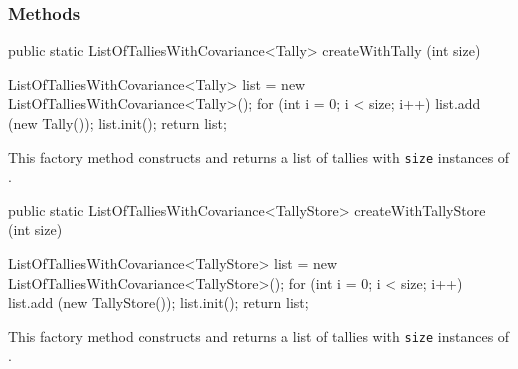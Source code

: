 \subsubsection*{Methods}
\begin{code}

   public static ListOfTalliesWithCovariance<Tally> createWithTally (int size)\begin{hide} {
      ListOfTalliesWithCovariance<Tally> list = new ListOfTalliesWithCovariance<Tally>();
      for (int i = 0; i < size; i++)
         list.add (new Tally());
      list.init();
      return list;
   }\end{hide}
\end{code}
\begin{tabb}  This factory method constructs and returns a list of tallies with \texttt{size} instances of
   .
\end{tabb}
\begin{htmlonly}
\end{htmlonly}
\begin{code}

   public static ListOfTalliesWithCovariance<TallyStore> createWithTallyStore
                                             (int size)\begin{hide} {
      ListOfTalliesWithCovariance<TallyStore> list = new ListOfTalliesWithCovariance<TallyStore>();
      for (int i = 0; i < size; i++)
         list.add (new TallyStore());
      list.init();
      return list;
   }\end{hide}
\end{code}
\begin{tabb}  This factory method constructs and returns a list of tallies with \texttt{size} instances of
   .
\end{tabb}
\begin{htmlonly}
\end{htmlonly}
